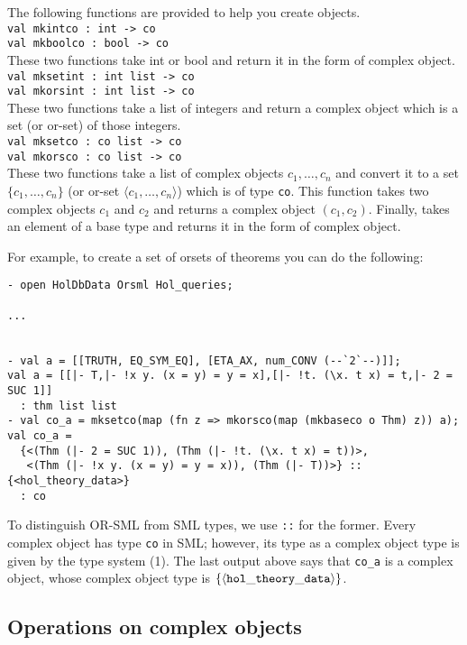The following functions are provided to help you create objects.\\
{\tt val mkintco : int -> co}\\
{\tt val mkboolco : bool -> co}\\
These two functions take int or bool and return it in the form of
complex object.\\
{\tt val mksetint : int list -> co}\\
{\tt val mkorsint : int list -> co}\\
These two functions take a list of integers and return a complex object 
which is a set (or or-set) of those integers.\\
{\tt val mksetco : co list -> co}\\
 {\tt val mkorsco : co list -> co}\\
These two functions take a list of complex objects $c_1,\ldots,c_n$
and convert it to a set $\{c_1,\ldots,c_n\}$ (or or-set $\langle
c_1,\ldots,c_n\rangle$) which is of type {\tt co}.
This function takes two complex objects $c_1$ and $c_2$ and returns a 
complex object $(c_1,c_2)$.
Finally, 
takes an element of a base type and returns it in the form of complex
object.

For example, to create a set of orsets of theorems you can do the
following:
{\small \begin{verbatim}
- open HolDbData Orsml Hol_queries;

...


- val a = [[TRUTH, EQ_SYM_EQ], [ETA_AX, num_CONV (--`2`--)]];
val a = [[|- T,|- !x y. (x = y) = y = x],[|- !t. (\x. t x) = t,|- 2 = SUC 1]]
  : thm list list
- val co_a = mksetco(map (fn z => mkorsco(map (mkbaseco o Thm) z)) a);
val co_a =
  {<(Thm (|- 2 = SUC 1)), (Thm (|- !t. (\x. t x) = t))>,
   <(Thm (|- !x y. (x = y) = y = x)), (Thm (|- T))>} :: {<hol_theory_data>}
  : co
\end{verbatim} }

To distinguish OR-SML from SML types, we use {\tt ::} for the former.
Every complex object has type {\tt co} in SML; however, its type as a
complex object type is given by the type system (1). The last output
above says that {\tt co\_a} is a complex object, whose complex object
type is $\{\langle {\tt hol\_theory\_data} \rangle\}$.


\subsection{Operations on complex objects}

